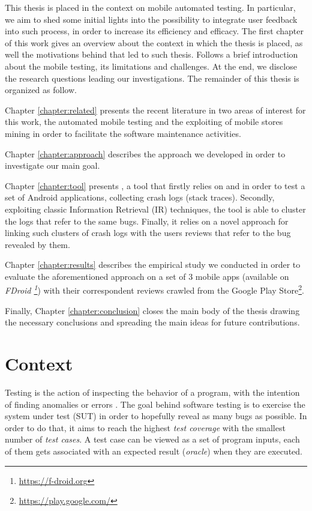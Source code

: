 \label{chapter:intro}
This thesis is placed in the context on mobile automated testing. In particular, we aim to shed some initial lights into the possibility to integrate user feedback into such process, in order to increase its efficiency and efficacy.
The first chapter of this work gives an overview about the context in which the thesis is placed, as well the motivations behind that led to such thesis. Follows a brief introduction about the mobile testing, its limitations and challenges. At the end, we disclose the research questions leading our investigations. 
The remainder of this thesis is organized as follow. 

Chapter \ref{chapter:related} presents the recent literature in two areas of interest for this work, \ie the automated mobile testing and the exploiting of mobile stores mining in order to facilitate the software maintenance activities.

Chapter \ref{chapter:approach} describes the approach we developed in order to investigate our main goal.

Chapter \ref{chapter:tool} presents \toolname, a tool that firstly relies on \monkey and \sapienz in order to test a set of Android applications, collecting crash logs (\ie stack traces). Secondly, exploiting classic Information Retrieval (IR) techniques, the tool is able to cluster the logs that refer to the same bugs. Finally, it relies on a novel approach for linking such clusters of crash logs with the users reviews that refer to the bug revealed by them. 

Chapter \ref{chapter:results} describes the empirical study we conducted in order to evaluate the aforementioned approach on a set of 3 mobile apps (available on \textit{FDroid \footnote{\url{https://f-droid.org}}}) with their correspondent reviews crawled from the Google Play Store\footnote{\url{https://play.google.com/}}. 

Finally, Chapter \ref{chapter:conclusion} closes the main body of the thesis drawing the necessary conclusions and spreading the main ideas for future contributions.


\section{Context}
Testing is the action of inspecting the behavior of a program, with the intention of finding anomalies or errors \cite{testing}.
The goal behind software testing is to exercise the system under test (SUT) in order to hopefully reveal as many bugs as possible. In order to do that, it aims to reach the highest \textit{test coverage} with the smallest number of \textit{test cases}. A test case can be viewed as a set of program inputs, each of them gets associated with an expected result (\ie \textit{oracle}) when they are executed. 

